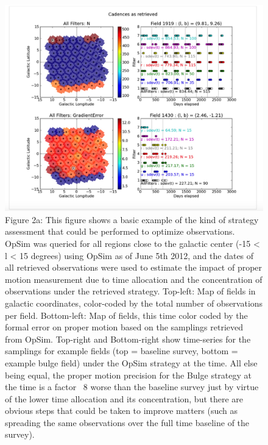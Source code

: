 \begin{figure}[h]
    \centering
    \includegraphics[width=1.0\textwidth]{bulge_fig2a.jpeg}
    \caption{\label{fig:bulge2a}
Figure 2a: This figure shows a basic example of the kind of strategy assessment that could be performed to optimize observations. OpSim was queried for all regions close to the galactic center (-15 < l < 15 degrees) using OpSim as of June 5th 2012, and the dates of all retrieved observations were used to estimate the impact of proper motion measurement due to time allocation and the concentration of observations under the retrieved strategy. Top-left: Map of fields in galactic coordinates, color-coded by the total number of observations per field. 
Bottom-left: Map of fields, this time color coded by the formal error on proper motion based on the samplings retrieved from OpSim. Top-right and Bottom-right show time-series for the samplings for example fields (top = baseline survey, bottom = example bulge field) under the OpSim strategy at the time. All else being equal, the proper motion precision for the Bulge strategy at the time is a factor ~8 worse than the baseline survey just by virtue of the lower time allocation and its concentration, but there are obvious steps that could be taken to improve matters (such as spreading the same observations over the full time baseline of the survey). }
\end{figure}

